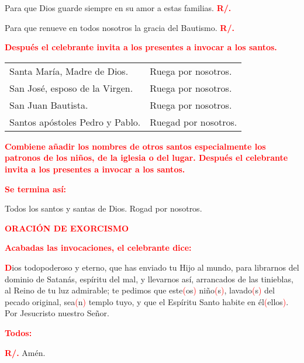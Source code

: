 \documentclass[12pt, letterpaper]{report}
\begin{document}
\Large {Para que Dios guarde siempre en su amor a estas familias.
\hspace{1cm} \bfseries \textcolor{red}{R/.}}

\Large {Para que renueve en todos nosotros la gracia del Bautismo.
\hspace{1cm} \bfseries \textcolor{red}{R/.}}

\large {\bfseries \textcolor{red}{Despu\'es el celebrante invita a los presentes a invocar a los santos.}} 

\Large \begin{tabular}{ll}
Santa Mar\'ia, Madre de Dios.& Ruega por nosotros. \\
San Jos\'e, esposo de la Virgen.& Ruega por nosotros. \\
San Juan Bautista.& Ruega por nosotros. \\
Santos ap\'ostoles Pedro y Pablo.& Ruegad por nosotros.
\end{tabular} 

\large {\bfseries \textcolor{red}{Combiene a\~nadir los nombres de otros santos especialmente los patronos de los ni\~nos, de la iglesia o del lugar. Despu\'es el celebrante invita a los presentes a invocar a los santos.}} 

\large {\bfseries \textcolor{red}{Se termina as\'i:}} 

\Large Todos los santos y santas de Dios. Rogad por nosotros. 

\newpage

\Large {\bfseries \textcolor{red}{ORACI\'ON DE EXORCISMO}} 

\large {\bfseries \textcolor{red}{Acabadas las invocaciones, el celebrante dice:}} 

\lettrine[lines=1]{\bfseries \textcolor{red}{D}}{}\Large ios todopoderoso y eterno, que has enviado tu Hijo al mundo, para librarnos del dominio de Satan\'as, esp\'iritu del mal, y llevarnos as\'i, arrancados de las tinieblas, al Reino de tu luz admirable; te pedimos que este\textcolor{red}{(}os\textcolor{red}{)} ni\~no\textcolor{red}{(}s\textcolor{red}{)}, lavado\textcolor{red}{(}s\textcolor{red}{)} del pecado original, sea\textcolor{red}{(}n\textcolor{red}{)} templo tuyo, y que el Esp\'iritu Santo habite en \'el\textcolor{red}{(}ellos\textcolor{red}{)}. Por Jesucristo nuestro Se\~nor.

\large {\bfseries \textcolor{red}{Todos:}}

\noindent
\Large {\bfseries \textcolor{red}{R/.}} \hspace{0.5cm} Am\'en.
\end{document}
